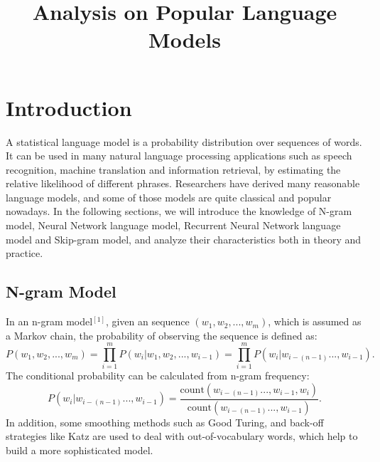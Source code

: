 \documentclass[11pt, oneside]{article}   	%
\title{Analysis on Popular Language Models}
\begin{document}
\maketitle
\section{Introduction}
A statistical language model is a probability distribution over sequences of words. It can be used in many natural language processing applications such as speech recognition, machine translation and information retrieval, by estimating the relative likelihood of different phrases. Researchers have derived many reasonable language models, and some of those models are quite classical and popular nowadays. In the following sections, we will introduce the knowledge of N-gram model, Neural Network language model, Recurrent Neural Network language model and Skip-gram model, and analyze their characteristics both in theory and practice.
\subsection{N-gram Model}
In an n-gram model$^{[1]}$, given an sequence $(w_1,w_2,...,w_m)$, which is assumed as a Markov chain, the probability of observing the sequence is defined as:
\[
P(w_1,w_2,...,w_m)=\prod_{i=1}^{m}{P(w_i|w_1,w_2,...,w_{i-1})}= \prod_{i=1}^{m}{P(w_i|w_{i-(n-1)}...,w_{i-1})}.
\]
The conditional probability can be calculated from n-gram frequency:
\[
P(w_i|w_{i-(n-1)}...,w_{i-1})=\frac{\text{count}(w_{i-(n-1)}...,w_{i-1},w_{i})}{\text{count}(w_{i-(n-1)}...,w_{i-1})}.
\]
In addition, some smoothing methods such as Good Turing, and back-off strategies like Katz are used to deal with out-of-vocabulary words, which help to build a more sophisticated model.
\end{document}

